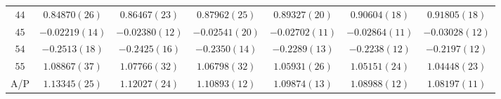 \begin{table}
\begin{center}
\begin{tabular}{c|c c c c c c}
$44$ & $0.84870(26)$ & $0.86467(23)$ & $0.87962(25)$ & $0.89327(20)$ & $0.90604(18)$ & $0.91805(18)$ \\
$45$ & $-0.02219(14)$ & $-0.02380(12)$ & $-0.02541(20)$ & $-0.02702(11)$ & $-0.02864(11)$ & $-0.03028(12)$ \\
$54$ & $-0.2513(18)$ & $-0.2425(16)$ & $-0.2350(14)$ & $-0.2289(13)$ & $-0.2238(12)$ & $-0.2197(12)$ \\
$55$ & $1.08867(37)$ & $1.07766(32)$ & $1.06798(32)$ & $1.05931(26)$ & $1.05151(24)$ & $1.04448(23)$ \\
\hline
A/P & $1.13345(25)$ & $1.12027(24)$ & $1.10893(12)$ & $1.09874(13)$ & $1.08988(12)$ & $1.08197(11)$ \\
\hline
\hline
\end{tabular}
\end{center}
\end{table}